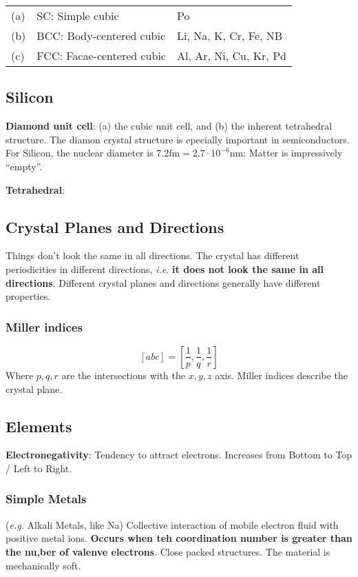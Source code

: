 \documentclass[a4paper, fontsize=8pt, landscape, DIV=1]{scrartcl}
\begin{document}
\begin{multicols*}{4}
  \begin{tabular}[h]{l l p{1.5cm}}
    (a) & SC: Simple cubic & Po \\
    (b) & BCC: Body-centered cubic & Li, Na, K, Cr, Fe, NB \\
    (c) & FCC: Facae-centered cubic & Al, Ar, Ni, Cu, Kr, Pd \\
  \end{tabular}

  \subsection{Silicon}
  \textbf{Diamond unit cell}: (a) the cubic unit cell, and (b) the inherent tetrahedral structure. The diamon crystal structure is epecially important in semiconductors. For Silicon, the nuclear diameter is $7.2\text{fm} = 2.7\cdot 10^{-6}\text{nm}$: Matter is impressively ``empty''.

  \textbf{Tetrahedral}:

  \subsection{Crystal Planes and Directions}
  Things don't look the same in all directions. The crystal has different periodicities in different directions, \textit{i.e.} \textbf{it does not look the same in all directions}. Different crystal planes and directions generally have different properties.
  
  \subsubsection{Miller indices}
  \[[abc] = \left[\frac{1}{p},\frac{1}{q},\frac{1}{r}\right]\]
  Where $p,q,r$ are the intersections with the $x,y,z$ axis. Miller indices describe the crystal plane.

  \subsection{Elements}
  \textbf{Electronegativity}: Tendency to attract electrons. Increases from Bottom to Top / Left to Right.

  \subsubsection{Simple Metals}
  (\textit{e.g.} Alkali Metals, like Na) Collective interaction of mobile electron fluid with positive metal ions. \textbf{Occurs when teh coordination number is greater than the nu,ber of valenve electrons}. Close packed structures. The material is mechanically soft. 

\end{multicols*}
\end{document}
